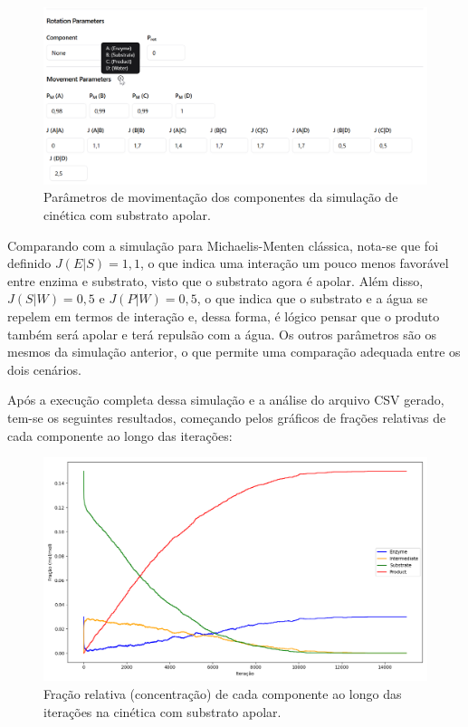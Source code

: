 \documentclass[12pt,oneside]{report}
\begin{document}
\begin{figure}[H]
    \centering
    \includegraphics[width=1\textwidth]{movement_MM_apolar.png}
    \caption{\small Parâmetros de movimentação dos componentes da simulação de cinética com substrato apolar.}
    \label{fig:michaelis_menten_movement_apolar}
\end{figure}

Comparando com a simulação para Michaelis-Menten clássica, nota-se que foi definido $J (E|S) = 1{,}1$, o que indica uma interação um pouco menos favorável entre enzima e substrato, visto que o substrato agora é apolar. Além disso, $J (S|W) = 0{,}5$ e $J (P|W) = 0{,}5$, o que indica que o substrato e a água se repelem em termos de interação e, dessa forma, é lógico pensar que o produto também será apolar e terá repulsão com a água. Os outros parâmetros são os mesmos da simulação anterior, o que permite uma comparação adequada entre os dois cenários.

Após a execução completa dessa simulação e a análise do arquivo CSV gerado, tem-se os seguintes resultados, começando pelos gráficos de frações relativas de cada componente ao longo das iterações:

\begin{figure}[H]
    \centering
    \includegraphics[width=1\textwidth]{MM_apolar_conc.png}
    \caption{\small Fração relativa (concentração) de cada componente ao longo das iterações na cinética com substrato apolar.}
    \label{fig:MM_apolar_conc}
\end{figure}
\end{document}

